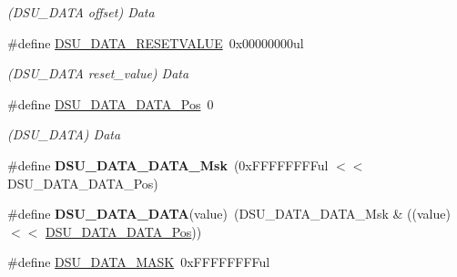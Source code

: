 \begin{DoxyCompactItemize}
\begin{DoxyCompactList}\small\item\em (D\+S\+U\+\_\+\+D\+A\+T\+A offset) Data \end{DoxyCompactList}\item 
\hypertarget{group___s_a_m_l21___d_s_u_ga3a9b805b6870ba197f179b0c6cc366ab}{}\#define \hyperlink{group___s_a_m_l21___d_s_u_ga3a9b805b6870ba197f179b0c6cc366ab}{D\+S\+U\+\_\+\+D\+A\+T\+A\+\_\+\+R\+E\+S\+E\+T\+V\+A\+L\+U\+E}~0x00000000ul\label{group___s_a_m_l21___d_s_u_ga3a9b805b6870ba197f179b0c6cc366ab}

\begin{DoxyCompactList}\small\item\em (D\+S\+U\+\_\+\+D\+A\+T\+A reset\+\_\+value) Data \end{DoxyCompactList}\item 
\hypertarget{group___s_a_m_l21___d_s_u_ga035409bf73a654618f87c65e2742bc35}{}\#define \hyperlink{group___s_a_m_l21___d_s_u_ga035409bf73a654618f87c65e2742bc35}{D\+S\+U\+\_\+\+D\+A\+T\+A\+\_\+\+D\+A\+T\+A\+\_\+\+Pos}~0\label{group___s_a_m_l21___d_s_u_ga035409bf73a654618f87c65e2742bc35}

\begin{DoxyCompactList}\small\item\em (D\+S\+U\+\_\+\+D\+A\+T\+A) Data \end{DoxyCompactList}\item 
\hypertarget{group___s_a_m_l21___d_s_u_ga23b8e4cde6cb91cf05bb65a48c1250c2}{}\#define {\bfseries D\+S\+U\+\_\+\+D\+A\+T\+A\+\_\+\+D\+A\+T\+A\+\_\+\+Msk}~(0x\+F\+F\+F\+F\+F\+F\+F\+Ful $<$$<$ D\+S\+U\+\_\+\+D\+A\+T\+A\+\_\+\+D\+A\+T\+A\+\_\+\+Pos)\label{group___s_a_m_l21___d_s_u_ga23b8e4cde6cb91cf05bb65a48c1250c2}

\item 
\hypertarget{group___s_a_m_l21___d_s_u_gaeb9ece8dc9d2857876bb710844551cda}{}\#define {\bfseries D\+S\+U\+\_\+\+D\+A\+T\+A\+\_\+\+D\+A\+T\+A}(value)~(D\+S\+U\+\_\+\+D\+A\+T\+A\+\_\+\+D\+A\+T\+A\+\_\+\+Msk \& ((value) $<$$<$ \hyperlink{group___s_a_m_l21___d_s_u_ga035409bf73a654618f87c65e2742bc35}{D\+S\+U\+\_\+\+D\+A\+T\+A\+\_\+\+D\+A\+T\+A\+\_\+\+Pos}))\label{group___s_a_m_l21___d_s_u_gaeb9ece8dc9d2857876bb710844551cda}

\item 
\hypertarget{group___s_a_m_l21___d_s_u_ga8ef0cc4d206f8b748482d8f40d4743e5}{}\#define \hyperlink{group___s_a_m_l21___d_s_u_ga8ef0cc4d206f8b748482d8f40d4743e5}{D\+S\+U\+\_\+\+D\+A\+T\+A\+\_\+\+M\+A\+S\+K}~0x\+F\+F\+F\+F\+F\+F\+F\+Ful\label{group___s_a_m_l21___d_s_u_ga8ef0cc4d206f8b748482d8f40d4743e5}


\end{DoxyCompactItemize}
